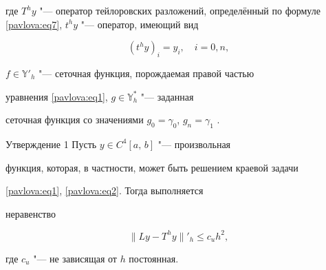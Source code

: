 где $T^hy$ "--- оператор тейлоровских разложений, определённый по формуле \eqref{pavlova:eq7}, $t^hy$ "--- оператор, имеющий вид

\[

(t^hy)_i =y_i, \quad  i=0,n,

\]

$f\in \mathbb{Y}'_h $ "--- сеточная функция, порождаемая правой частью

уравнения \eqref{pavlova:eq1}, \mbox{$g\in \mathbb{Y}_h^\ast$} "--- заданная

сеточная функция со значениями $g_0 =\gamma _0$, $g_n =\gamma_1$ \cite{pavlova:bib2}.



\begin{newthm}{Утверждение 1} Пусть $y\in C^4[a,\,b]$ "--- произвольная

функция, которая, в частности, может быть решением краевой задачи

\eqref{pavlova:eq1}, \eqref{pavlova:eq2}. Тогда выполняется

неравенство

\[

\| Ly-T^hy\|'_h \le c_u h^2,

\]

где $c_u $ "--- не зависящая от $h$ постоянная.

\end{newthm}




